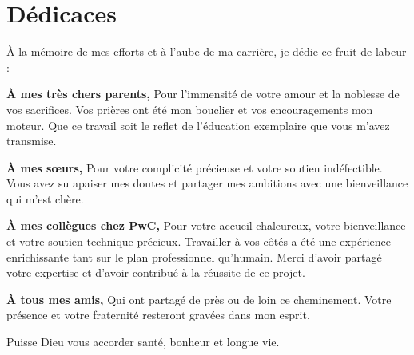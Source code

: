 \chapter*{Dédicaces}

\begin{center}
\it \large

À la mémoire de mes efforts et à l'aube de ma carrière, je dédie ce fruit de labeur :

\vspace{5mm}
\textbf{À mes très chers parents,}
Pour l'immensité de votre amour et la noblesse de vos sacrifices. Vos prières ont été mon bouclier et vos encouragements mon moteur. Que ce travail soit le reflet de l'éducation exemplaire que vous m'avez transmise.

\vspace{5mm}
\textbf{À mes sœurs,}
Pour votre complicité précieuse et votre soutien indéfectible. Vous avez su apaiser mes doutes et partager mes ambitions avec une bienveillance qui m'est chère.

\vspace{5mm}
\textbf{À mes collègues chez PwC,}
Pour votre accueil chaleureux, votre bienveillance et votre soutien technique précieux. Travailler à vos côtés a été une expérience enrichissante tant sur le plan professionnel qu'humain. Merci d'avoir partagé votre expertise et d'avoir contribué à la réussite de ce projet.

\vspace{5mm}
\textbf{À tous mes amis,}
Qui ont partagé de près ou de loin ce cheminement. Votre présence et votre fraternité resteront gravées dans mon esprit.

\vspace{8mm}
Puisse Dieu vous accorder santé, bonheur et longue vie.

\end{center}
